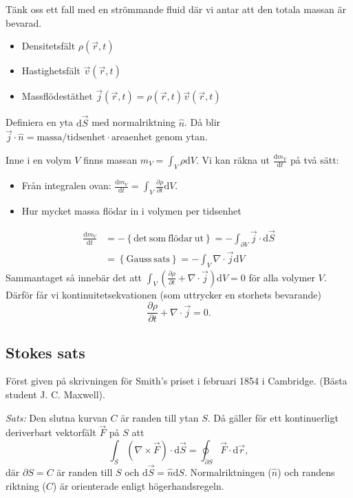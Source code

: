 \documentclass[%
oneside,                 %
final,                   %
10pt]{article}
\begin{document}
Tänk oss ett fall med en strömmande fluid där vi antar att den totala massan är bevarad.
\begin{itemize}
\item Densitetsfält $\rho(\vec{r},t)$

\item Hastighetsfält $\vec{v}(\vec{r},t)$

\item Massflödestäthet $\vec{j}(\vec{r},t) = \rho(\vec{r},t) \vec{v}(\vec{r},t)$
\end{itemize}

\noindent
Definiera en yta $\mbox{d}\vec{S}$ med normalriktning $\hat{n}$. Då blir $\vec{j} \cdot \hat{n} = \mathrm{massa}/\mathrm{tidsenhet} \cdot \mathrm{areaenhet}$ genom ytan.

Inne i en volym $V$ finns massan $m_V = \int_V \rho \mbox{d}V$. Vi kan räkna ut $\frac{\mbox{d}m_V}{\mbox{d}t}$ på två sätt:
\begin{itemize}
\item Från integralen ovan: $\frac{\mbox{d}m_V}{\mbox{d}t} = \int_V \frac{\partial \rho}{\partial t} \mbox{d}V$.

\item Hur mycket massa flödar in i volymen per tidsenhet 
\end{itemize}

\noindent
\begin{align}
\frac{\mbox{d}m_V}{\mbox{d}t} &=
-\left\{ \mathrm{det~som~flödar~ut} \right\}
= -\int_{\partial V} \vec{j} \cdot \mbox{d}\vec{S} \nonumber \\
&= \left\{ \mathrm{Gauss~sats} \right\} = -\int_V \nabla \cdot \vec{j} \mbox{d} V 
\end{align}
Sammantaget så innebär det att $\int_V \left( \frac{\partial \rho}{\partial t} + \nabla \cdot \vec{j} \right) \mbox{d}V = 0$ för alla volymer $V$. Därför får vi kontinuitetsekvationen (som uttrycker en storhets bevarande)
\begin{equation}
\frac{\partial \rho}{\partial t} + \nabla \cdot \vec{j} = 0.
\end{equation}

\subsection{Stokes sats}

Först given på skrivningen för Smith's priset i februari 1854 i Cambridge.  (Bästa student J. C. Maxwell).

\emph{Sats:}  Den slutna kurvan $C$ är randen till ytan $S$. Då gäller för ett kontinuerligt deriverbart vektorfält $\vec{F}$ på $S$ att
\begin{equation}
  \int_S \left( \nabla \times \vec{F}\right) \cdot \mbox{d}\vec{S} = \oint_{\partial S} \vec{F}\cdot
\mbox{d}\vec{r},
\end{equation}
där $\partial S = C$ är randen till $S$ och $\mbox{d}\vec{S} = \hat{n} \mbox{d} S$. Normalriktningen ($\hat{n}$) och randens riktning ($C$) är orienterade enligt högerhandsregeln.
\end{document}
